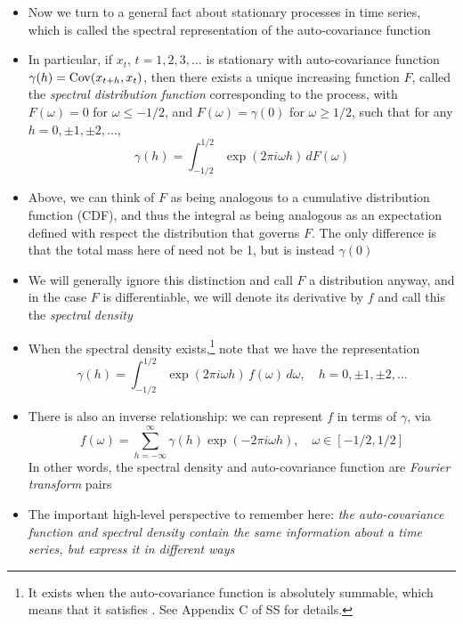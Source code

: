 \documentclass{article}
\begin{document}
\begin{itemize}
\item Now we turn to a general fact about stationary processes in time series,
  which is called the spectral representation of the auto-covariance function 

\item In particular, if $x_t$, $t = 1,2,3,\dots$ is stationary with
  auto-covariance function $\gamma(h) = \operatorname{Cov}(x_{t+h}, x_t)$, then there exists a 
  unique increasing function $F$, called the \emph{spectral distribution
    function} corresponding to the process, with $F(\omega) = 0$ for $\omega
  \leq -1/2$, and $F(\omega) = \gamma(0)$ for $\omega \geq 1/2$, such that for
  any $h = 0, \pm 1, \pm 2, \dots$,  
  \[
  \gamma(h) = \int_{-1/2}^{1/2} \exp(2\pi i \omega h) \, dF(\omega) 
  \]

\item Above, we can think of $F$ as being analogous to a cumulative distribution
  function (CDF), and thus the integral as being analogous as an expectation
  defined with respect the distribution that governs $F$. The only difference is
  that the total mass here of need not be 1, but is instead $\gamma(0)$ 

\item We will generally ignore this distinction and call $F$ a distribution
  anyway, and in the case $F$ is differentiable, we will denote its derivative
  by $f$ and call this the \emph{spectral density}

\item When the spectral density exists,\footnote{It exists when the
    auto-covariance function is absolutely summable, which means that it
    satisfies . See
    Appendix C of SS for details.} 
  note that we have the representation 
  \[
  \gamma(h) = \int_{-1/2}^{1/2} \exp(2\pi i \omega h) \, f(\omega) \, d\omega,
  \quad h = 0, \pm 1, \pm 2, \dots
  \]

\item There is also an inverse relationship: we can represent $f$ in terms of
  $\gamma$, via 
  \begin{equation}
  \label{eq:spectral_density}
  f(\omega) = \sum_{h=-\infty}^\infty \gamma(h) \exp(-2\pi i \omega h), \quad
  \omega \in [-1/2, 1/2] 
  \end{equation}
  In other words, the spectral density and auto-covariance function are
  \emph{Fourier transform} pairs

\item The important high-level perspective to remember here: \emph{the
    auto-covariance function and spectral density contain the same information 
    about a time series, but express it in different ways}


\end{itemize}
\end{document}
